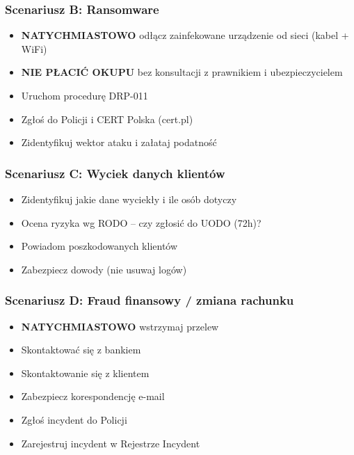 \documentclass[12pt,a4paper]{article}
\providecommand{\tightlist}{\setlength{\itemsep}{0pt}\setlength{\parskip}{0pt}}
\begin{document}
\subsubsection{Scenariusz B:
Ransomware}\label{scenariusz-b-ransomware}

\begin{itemize}
\tightlist
\item
  \textbf{NATYCHMIASTOWO} odłącz zainfekowane urządzenie od sieci (kabel
  + WiFi)
\item
  \textbf{NIE PŁACIĆ OKUPU} bez konsultacji z prawnikiem i
  ubezpieczycielem
\item
  Uruchom procedurę DRP-011
\item
  Zgłoś do Policji i CERT Polska (cert.pl)
\item
  Zidentyfikuj wektor ataku i załataj podatność
\end{itemize}

\subsubsection{Scenariusz C: Wyciek danych
klientów}\label{scenariusz-c-wyciek-danych-klientuxf3w}

\begin{itemize}
\tightlist
\item
  Zidentyfikuj jakie dane wyciekły i ile osób dotyczy
\item
  Ocena ryzyka wg RODO -- czy zgłosić do UODO (72h)?
\item
  Powiadom poszkodowanych klientów
\item
  Zabezpiecz dowody (nie usuwaj logów)
\end{itemize}

\subsubsection{Scenariusz D: Fraud finansowy / zmiana rachunku}\label{scenariusz-D-kompromitacja-systemu}
\begin{itemize}
\tightlist
\item
\textbf{NATYCHMIASTOWO} wstrzymaj przelew
\item
Skontaktować się z bankiem
\item
Skontaktowanie się z klientem
\item
Zabezpiecz korespondencję e-mail
\item
Zgłoś incydent do Policji
\item 
Zarejestruj incydent w Rejestrze Incydent
\end{itemize}
\end{document}
